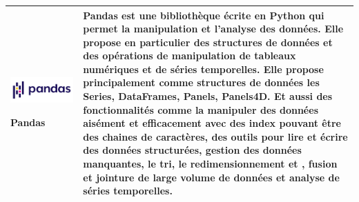 \begin{table}[H]
\begin{tabular}{|m{5cm}|m{12cm}|}
	\begin{center}
	    \begin{minipage}{.3\textwidth}
      \includegraphics[width=\textwidth]{images/chapitre7/pandas.png}
    \end{minipage}
	\end{center}
  \centering \textbf{Pandas} \cite{mckinney2010data} & Pandas est une bibliothèque écrite en Python qui permet la manipulation et l'analyse des données. Elle propose en particulier des structures de données et des opérations de manipulation de tableaux numériques et de séries temporelles. Elle propose principalement comme structures de données les Series, DataFrames, Panels, Panels4D. Et aussi des fonctionnalités comme la manipuler des données aisément et efficacement avec des index pouvant être des chaines de caractères, des outils pour lire et écrire des données structurées, gestion des données manquantes, le tri, le redimensionnement et , fusion et jointure de large volume de données et analyse de séries temporelles. \\ \hline


\end{tabular}
\end{table}
